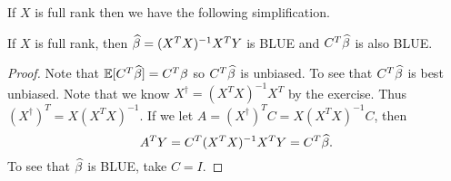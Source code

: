 If $X$ is full rank then we have the following simplification.
\begin{prop}
    If $X$ is full rank, then $\widehat{\beta} = (X^TX)^{-1}X^TY$ is BLUE and $C^T\widehat{\beta}$ is also BLUE.
\end{prop}
\begin{proof}
    Note that ${\mathbb{E}}[C^T\widehat{\beta}]= C^T\beta$ so $C^T\widehat{\beta}$ is unbiased. To see that $C^T\widehat{\beta}$ is best unbiased. Note that we know $X^\dagger = (X^TX)^{-1}X^T$ by the exercise. Thus $(X^\dagger)^T = X(X^TX)^{-1}$. If we let $A = (X^\dagger)^TC = X(X^TX)^{-1}C$, then 
    \[A^TY = C^T(X^TX)^{-1}X^TY=C^T\widehat{\beta}. \]
    To see that $\widehat{\beta}$ is BLUE, take $C = I$.
\end{proof}

